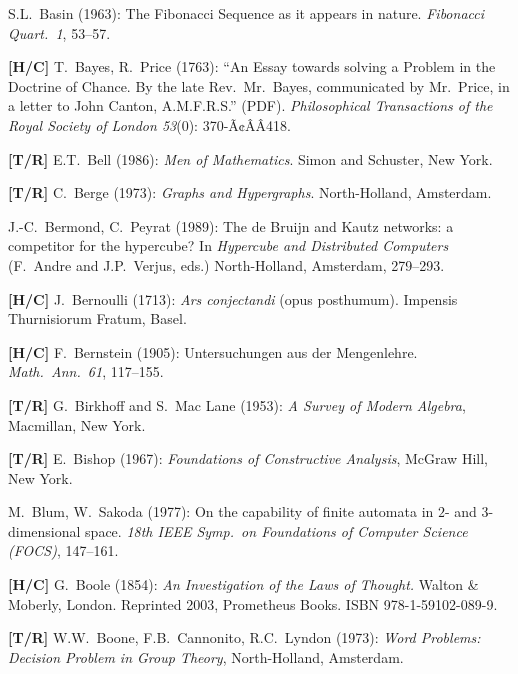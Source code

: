 \begin{thebibliography}{999}

S.L.~Basin (1963): The Fibonacci Sequence as it appears in nature.
{\it Fibonacci Quart.~1}, 53--57.

{\bf [H/C]}
T.~Bayes, R.~Price (1763): ``An Essay towards solving a Problem in the Doctrine of Chance.  By the late Rev.~Mr.~Bayes, communicated by Mr.~Price, in a letter to John Canton, A.M.F.R.S.'' (PDF).  {\it Philosophical Transactions of the Royal
Society of London 53}(0): 370-Ã¢ÂÂ418.

{\bf [T/R]}
E.T.~Bell (1986):
{\it Men of Mathematics}.
Simon and Schuster, New York.

{\bf [T/R]}
C.~Berge (1973):
{\it Graphs and Hypergraphs}.
North-Holland, Amsterdam.

J.-C.~Bermond, C.~Peyrat (1989):
The de Bruijn and Kautz networks: a competitor for the hypercube?  In {\it Hypercube and Distributed Computers} (F.~Andre and J.P.~Verjus, eds.)  North-Holland, Amsterdam, 279--293.

{\bf [H/C]}
J.~Bernoulli (1713):
{\it Ars conjectandi} (opus posthumum).
Impensis Thurnisiorum Fratum, Basel. 

{\bf [H/C]}
F.~Bernstein (1905): Untersuchungen aus der Mengenlehre.  {\it Math.~Ann.~61}, 117--155.

{\bf [T/R]}
G.~Birkhoff and S.~Mac Lane (1953): {\it A Survey of Modern Algebra}, Macmillan, New York.

{\bf [T/R]}
E.~Bishop (1967): {\it Foundations of Constructive Analysis}, McGraw Hill, New York.

M.~Blum, W.~Sakoda (1977):
On the capability of finite automata in $2$- and $3$- dimensional space.  {\it 18th IEEE Symp.~on Foundations of Computer Science (FOCS)}, 147--161.


{\bf [H/C]}
G.~Boole (1854):
{\it An Investigation of the Laws of Thought.}  
Walton \& Moberly, London.  Reprinted 2003, Prometheus Books. ISBN
978-1-59102-089-9.

{\bf [T/R]}
W.W.~Boone, F.B.~Cannonito, R.C.~Lyndon (1973):
{\it Word Problems: Decision Problem in Group Theory}, North-Holland, Amsterdam.


\end{thebibliography}
